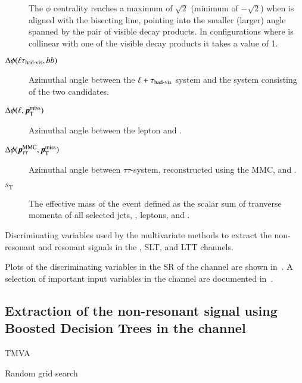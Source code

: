 \begin{description}
  The \pTmiss $\phi$ centrality reaches a maximum of $\sqrt{2}$
  (minimum of $-\sqrt{2}$) when \pTmiss is aligned with the bisecting
  line, pointing into the smaller (larger) angle spanned by the pair
  of visible \taulepton decay products. In configurations where
  \pTmiss is collinear with one of the visible \taulepton decay
  products it takes a value of 1.

\item[$\Delta\phi(\ell\tau_{\text{had-vis}}, bb)$] Azimuthal angle between the
  $\ell + \tau_{\text{had-vis}}$ system and the system consisting of the two
  \bjet candidates.

\item[$\Delta\phi(\ell, \pTmiss)$] Azimuthal angle between the lepton
  and \pTmiss.

\item[$\Delta\phi(\pTauTau, \pTmiss)$] Azimuthal angle between
  $\tau\tau$-system, reconstructed using the MMC, and \pTmiss.

\item[$s_{\text{T}}$] The effective mass of the event defined as the
  scalar sum of tranverse momenta of all selected jets, \tauhadvis,
  leptons, and \pTmissAbs.
\end{description}


\begin{table}[htbp]
  \centering

  

  \caption{Discriminating variables used by the multivariate methods
    to extract the non-resonant and resonant \HH signals in the
    \hadhad, \lephad SLT, and \lephad LTT channels.}
  \label{tab:mva_inputvars}
\end{table}




Plots of the discriminating variables in the SR of the \hadhad channel
are shown in~. A selection of important input variables in
the \lephad channel are documented in~\cite{ATLAS-CONF-2021-030}.



\subsection{Extraction of the non-resonant signal using Boosted
  Decision Trees in the \hadhad channel}
\label{sec:mva_smbdt}

TMVA


Random grid search

